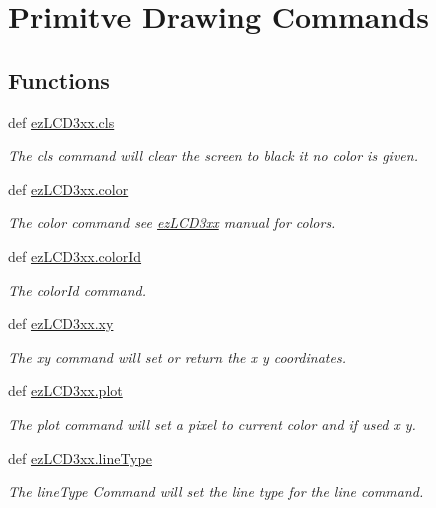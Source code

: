 \hypertarget{group___drawing}{\section{Primitve Drawing Commands}
\label{group___drawing}
}
\subsection*{Functions}
\begin{DoxyCompactItemize}
\item 
def \hyperlink{group___drawing_gacdfb97b09494d0e3cec787014c4863f9}{ez\-L\-C\-D3xx.\-cls}
\begin{DoxyCompactList}\small\item\em The cls command will clear the screen to black it no color is given. \end{DoxyCompactList}\item 
def \hyperlink{group___drawing_ga306a0e99b15bc1122683a1c6e18e7ef0}{ez\-L\-C\-D3xx.\-color}
\begin{DoxyCompactList}\small\item\em The color command see \hyperlink{namespaceez_l_c_d3xx}{ez\-L\-C\-D3xx} manual for colors. \end{DoxyCompactList}\item 
def \hyperlink{group___drawing_ga94dd8d046a01670fc2212b548e29e8d0}{ez\-L\-C\-D3xx.\-color\-Id}
\begin{DoxyCompactList}\small\item\em The color\-Id command. \end{DoxyCompactList}\item 
def \hyperlink{group___drawing_gaf249f02b6ad4e734ffa9d8371f6cab8a}{ez\-L\-C\-D3xx.\-xy}
\begin{DoxyCompactList}\small\item\em The xy command will set or return the x y coordinates. \end{DoxyCompactList}\item 
def \hyperlink{group___drawing_gad3c0ce418a0feea4a0fa40f803c90196}{ez\-L\-C\-D3xx.\-plot}
\begin{DoxyCompactList}\small\item\em The plot command will set a pixel to current color and if used x y. \end{DoxyCompactList}\item 
def \hyperlink{group___drawing_ga9dc821ce2652535899c584d4ff1c1bf7}{ez\-L\-C\-D3xx.\-line\-Type}
\begin{DoxyCompactList}\small\item\em The line\-Type Command will set the line type for the line command. \end{DoxyCompactList}\item 

\end{DoxyCompactItemize}
